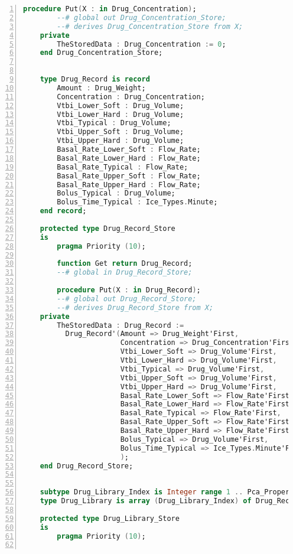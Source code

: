 \begin{lstlisting}[language=ada, gobble=0, numbers=left, caption={\lstinline{Pca_Types} package}]
        procedure Put(X : in Drug_Concentration);
        --# global out Drug_Concentration_Store;
        --# derives Drug_Concentration_Store from X;
    private
        TheStoredData : Drug_Concentration := 0;
    end Drug_Concentration_Store;


    type Drug_Record is record
        Amount : Drug_Weight;
        Concentration : Drug_Concentration;
        Vtbi_Lower_Soft : Drug_Volume;
        Vtbi_Lower_Hard : Drug_Volume;
        Vtbi_Typical : Drug_Volume;
        Vtbi_Upper_Soft : Drug_Volume;
        Vtbi_Upper_Hard : Drug_Volume;
        Basal_Rate_Lower_Soft : Flow_Rate;
        Basal_Rate_Lower_Hard : Flow_Rate;
        Basal_Rate_Typical : Flow_Rate;
        Basal_Rate_Upper_Soft : Flow_Rate;
        Basal_Rate_Upper_Hard : Flow_Rate;
        Bolus_Typical : Drug_Volume;
        Bolus_Time_Typical : Ice_Types.Minute;
    end record;

    protected type Drug_Record_Store
    is
        pragma Priority (10);

        function Get return Drug_Record;
        --# global in Drug_Record_Store;

        procedure Put(X : in Drug_Record);
        --# global out Drug_Record_Store;
        --# derives Drug_Record_Store from X;
    private
        TheStoredData : Drug_Record :=
          Drug_Record'(Amount => Drug_Weight'First,
                       Concentration => Drug_Concentration'First,
                       Vtbi_Lower_Soft => Drug_Volume'First,
                       Vtbi_Lower_Hard => Drug_Volume'First,
                       Vtbi_Typical => Drug_Volume'First,
                       Vtbi_Upper_Soft => Drug_Volume'First,
                       Vtbi_Upper_Hard => Drug_Volume'First,
                       Basal_Rate_Lower_Soft => Flow_Rate'First,
                       Basal_Rate_Lower_Hard => Flow_Rate'First,
                       Basal_Rate_Typical => Flow_Rate'First,
                       Basal_Rate_Upper_Soft => Flow_Rate'First,
                       Basal_Rate_Upper_Hard => Flow_Rate'First,
                       Bolus_Typical => Drug_Volume'First,
                       Bolus_Time_Typical => Ice_Types.Minute'First
                       );
    end Drug_Record_Store;


    subtype Drug_Library_Index is Integer range 1 .. Pca_Properties.Drug_Library_Size;
    type Drug_Library is array (Drug_Library_Index) of Drug_Record;

    protected type Drug_Library_Store
    is
        pragma Priority (10);


\end{lstlisting}
